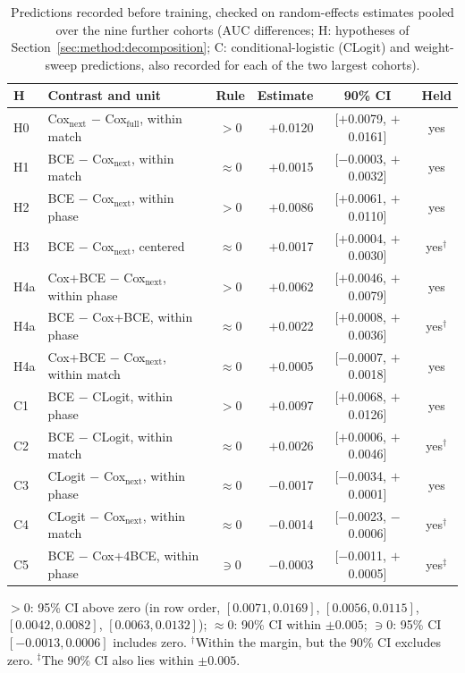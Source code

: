 \begin{table}[b]
\centering\footnotesize
\caption{Predictions recorded before training, checked on random-effects estimates pooled over the nine further cohorts (AUC differences; H: hypotheses of Section~\ref{sec:method:decomposition}; C: conditional-logistic (CLogit) and weight-sweep predictions, also recorded for each of the two largest cohorts).}
\label{tab:predictions}
\setlength{\tabcolsep}{2.1pt}
\begin{tabular}{llcrcc}
\toprule
H & Contrast and unit & Rule & Estimate & 90\% CI & Held \\
\midrule
H0 & Cox$_{\mathrm{next}}$ $-$ Cox$_{\mathrm{full}}$, within match & $>0$ & $+$0.0120 & [$+$0.0079, $+$0.0161] & yes \\
H1 & BCE $-$ Cox$_{\mathrm{next}}$, within match & $\approx0$ & $+$0.0015 & [$-$0.0003, $+$0.0032] & yes \\
H2 & BCE $-$ Cox$_{\mathrm{next}}$, within phase & $>0$ & $+$0.0086 & [$+$0.0061, $+$0.0110] & yes \\
H3 & BCE $-$ Cox$_{\mathrm{next}}$, centered & $\approx0$ & $+$0.0017 & [$+$0.0004, $+$0.0030] & yes$^\dagger$ \\
H4a & Cox+BCE $-$ Cox$_{\mathrm{next}}$, within phase & $>0$ & $+$0.0062 & [$+$0.0046, $+$0.0079] & yes \\
H4a & BCE $-$ Cox+BCE, within phase & $\approx0$ & $+$0.0022 & [$+$0.0008, $+$0.0036] & yes$^\dagger$ \\
H4a & Cox+BCE $-$ Cox$_{\mathrm{next}}$, within match & $\approx0$ & $+$0.0005 & [$-$0.0007, $+$0.0018] & yes \\
\midrule
C1 & BCE $-$ CLogit, within phase & $>0$ & $+$0.0097 & [$+$0.0068, $+$0.0126] & yes \\
C2 & BCE $-$ CLogit, within match & $\approx0$ & $+$0.0026 & [$+$0.0006, $+$0.0046] & yes$^\dagger$ \\
C3 & CLogit $-$ Cox$_{\mathrm{next}}$, within phase & $\approx0$ & $-$0.0017 & [$-$0.0034, $+$0.0001] & yes \\
C4 & CLogit $-$ Cox$_{\mathrm{next}}$, within match & $\approx0$ & $-$0.0014 & [$-$0.0023, $-$0.0006] & yes$^\dagger$ \\
C5 & BCE $-$ Cox+4BCE, within phase & $\ni0$ & $-$0.0003 & [$-$0.0011, $+$0.0005] & yes$^\ddagger$ \\
\bottomrule
\end{tabular}
\smallskip
\parbox{\columnwidth}{\scriptsize $>0$: 95\% CI above zero (in row order, $[0.0071, 0.0169]$, $[0.0056, 0.0115]$, $[0.0042, 0.0082]$, $[0.0063, 0.0132]$); $\approx0$: 90\% CI within $\pm0.005$; $\ni0$: 95\% CI $[-0.0013, 0.0006]$ includes zero. $^\dagger$Within the margin, but the 90\% CI excludes zero. $^\ddagger$The 90\% CI also lies within $\pm0.005$.}
\end{table}
